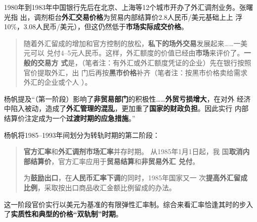 1980年到1983年中国银行先后在北京、上海等12个城市开办了外汇调剂业务。张曙光指
出，调剂柜台\textbf{外汇交易价格}为贸易内部结算价2.8人民币/美元基础上上
浮10\%，3.08人民币/美元），但这仍然低于\textbf{市场实际成交价格}。

\begin{quotation}
  随着外汇留成的增加和官方控制的放松，\textbf{私下的场外交易}发展起来……一美元可以
  兑付4--5元人民币。这样，外汇额度的价值已经由\textbf{市场}来评价了。\textbf{一般的交易方
    式}是，（笔者注：有外汇或外汇额度凭证的企业）先在银行按照官价提取外汇，出
  门后再按\textbf{黑市价格}补齐（笔者注：按黑市价格卖给需求外汇的企业或个人
  ）。
\end{quotation}

杨帆提及“（第一阶段）影响了\textbf{非贸易部门}的积极性……\textbf{外贸亏损增大}，在对外
经济中陷入被动，造成了\textbf{外汇管理的混乱}，更加重了\textbf{国家的财政负担}。因此实行
内部结算价注定成为一个\textbf{过渡时期的应急措施}。”

杨帆将1985--1993年间划分为转轨时期的第二阶段：
\begin{quotation}
  \textbf{官方汇率}和\textbf{外汇调剂市场汇率}并存时期。 从1985年1月1日起，我
  国\textbf{取消内部结算价}，官方汇率应用于\textbf{贸易结算}和\textbf{非贸易外汇
    兑付}。

  为\textbf{鼓励出口}，在\textbf{人民币汇率下调}的同时，1985年国家又一
  次\textbf{提高外汇留成比例}，采取按出口商品收汇金额比例留成的办法。
\end{quotation}
这一阶段官价实行以美元为基准的有限弹性汇率制。综合来看汇率恰逢其时的步入
了\textbf{实质性和典型的价格“双轨制”时期}。

